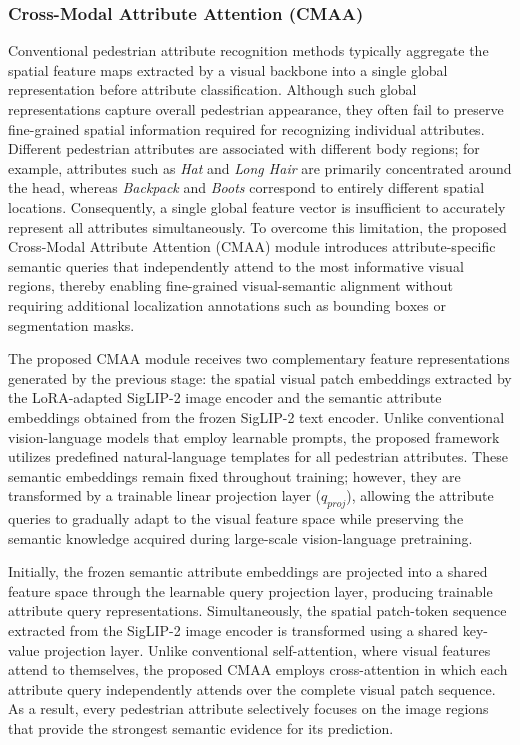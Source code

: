 \documentclass{ieeeaccess}
\begin{document}
\subsubsection{Cross-Modal Attribute Attention (CMAA)}

Conventional pedestrian attribute recognition methods typically aggregate the spatial feature maps extracted by a visual backbone into a single global representation before attribute classification. Although such global representations capture overall pedestrian appearance, they often fail to preserve fine-grained spatial information required for recognizing individual attributes. Different pedestrian attributes are associated with different body regions; for example, attributes such as \textit{Hat} and \textit{Long Hair} are primarily concentrated around the head, whereas \textit{Backpack} and \textit{Boots} correspond to entirely different spatial locations. Consequently, a single global feature vector is insufficient to accurately represent all attributes simultaneously. To overcome this limitation, the proposed Cross-Modal Attribute Attention (CMAA) module introduces attribute-specific semantic queries that independently attend to the most informative visual regions, thereby enabling fine-grained visual-semantic alignment without requiring additional localization annotations such as bounding boxes or segmentation masks.

The proposed CMAA module receives two complementary feature representations generated by the previous stage: the spatial visual patch embeddings extracted by the LoRA-adapted SigLIP-2 image encoder and the semantic attribute embeddings obtained from the frozen SigLIP-2 text encoder. Unlike conventional vision-language models that employ learnable prompts, the proposed framework utilizes predefined natural-language templates for all pedestrian attributes. These semantic embeddings remain fixed throughout training; however, they are transformed by a trainable linear projection layer ($q_{proj}$), allowing the attribute queries to gradually adapt to the visual feature space while preserving the semantic knowledge acquired during large-scale vision-language pretraining.

Initially, the frozen semantic attribute embeddings are projected into a shared feature space through the learnable query projection layer, producing trainable attribute query representations. Simultaneously, the spatial patch-token sequence extracted from the SigLIP-2 image encoder is transformed using a shared key-value projection layer. Unlike conventional self-attention, where visual features attend to themselves, the proposed CMAA employs cross-attention in which each attribute query independently attends over the complete visual patch sequence. As a result, every pedestrian attribute selectively focuses on the image regions that provide the strongest semantic evidence for its prediction.
\end{document}
